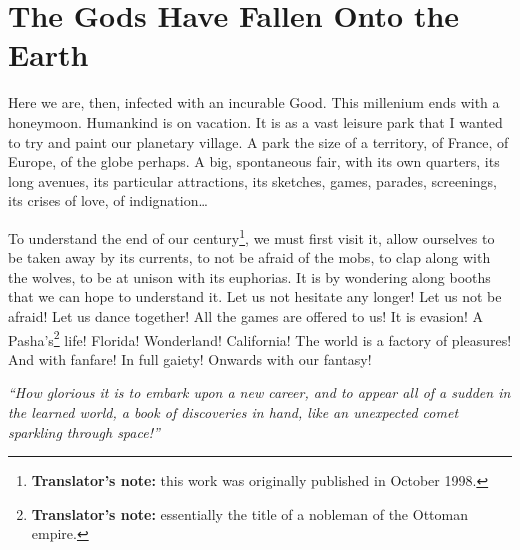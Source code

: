 \chapter{The Gods Have Fallen Onto the Earth}
\label{ch:1}

Here we are, then, infected with an incurable Good. This millenium ends with a honeymoon. Humankind is on vacation. It is as a vast leisure park that I wanted to try and paint our planetary village. A park the size of a territory, of France, of Europe, of the globe perhaps. A big, spontaneous fair, with its own quarters, its long avenues, its particular attractions, its sketches, games, parades, screenings, its crises of love, of indignation\dots~

To understand the end of our century\footnote{\textbf{Translator's note:} this work was originally published in October 1998.}, we must first visit it, allow ourselves to be taken away by its currents, to not be afraid of the mobs, to clap along with the wolves, to be at unison with its euphorias. It is by wondering along booths that we can hope to understand it. Let us not hesitate any longer! Let us not be afraid! Let us dance together! All the games are offered to us! It is evasion! A Pasha's\footnote{\textbf{Translator's note:} essentially the title of a nobleman of the Ottoman empire.} life! Florida! Wonderland! California! The world is a factory of pleasures! And with fanfare! In full gaiety! Onwards with our fantasy!

\begin{displayquote}
	\textit{
		``How glorious it is to embark upon a new career, and to appear all of a sudden in the learned world, a book of discoveries in hand, like an unexpected comet sparkling through space!''
	}
\end{displayquote}

